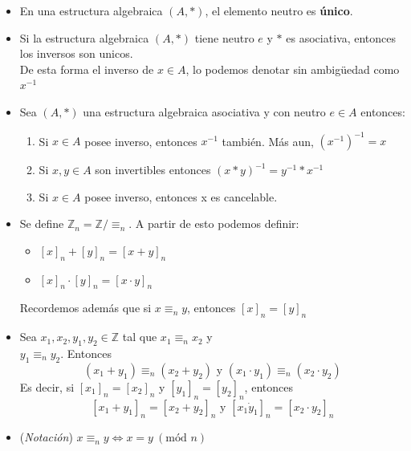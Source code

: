 \documentclass[letterpaper,10pt]{article}
\newcommand{\Z}{\mathbb Z}
\newcommand{\ssi}{\Longleftrightarrow} %
\theoremstyle{plain}
\begin{document}
\begin{framed}
\begin{multicols}{2}
\begin{itemize}
    \item En una estructura algebraica $(A,*)$, el elemento neutro es \textbf{único}.
    \item Si la estructura algebraica $(A,*)$ tiene neutro $e$ y $*$ es asociativa, entonces los inversos son unicos.\\
    De esta forma el inverso de $x\in A$, lo podemos denotar sin ambigüedad como $x^{-1}$
    
    \item Sea $(A,*)$ una estructura algebraica asociativa y con neutro $e \in A$ entonces:
        \begin{enumerate}
            \item Si $x\in A$ posee inverso, entonces $x^{-1}$ también. Más aun, $(x^{-1})^{-1}=x$
            \item Si $x,y \in A$ son invertibles entonces $(x*y)^{-1}=y^{-1}*x^{-1}$
            \item Si $x\in A$ posee inverso, entonces x es cancelable.
        \end{enumerate}
    \item Se define $\Z_n=\Z/\equiv_{n}$. A partir de esto podemos definir:
        \begin{itemize}
            \item $[x]_n + [y]_n=[x+y]_n$
            \item $[x]_n \cdot [y]_n=[x\cdot y]_n$
        \end{itemize}
    Recordemos además que si $x\equiv_n y$, entonces $[x]_n=[y]_n$
    
    \item Sea $x_1,x_2,y_1,y_2 \in \Z$ tal que $x_1\equiv_n x_2$ y \\$y_1\equiv_n y_2$. Entonces 
    $$ (x_1+y_1)\equiv_n (x_2+y_2) \text{ y }  (x_1\cdot y_1)\equiv_n (x_2\cdot y_2) $$
    Es decir, si $[x_1]_n = [x_2]_n$ y $[y_1]_n = [y_2]_n$, entonces
    $$ [x_1+y_1]_n=[x_2+y_2]_n \text{ y } [x_1\dot y_1]_n=[x_2 \cdot y_2]_n$$
    
    \item (\textit{Notación}) $x\equiv_ny  \ssi x=y ~(\text{mód } n)$
        \end{itemize}
    \end{multicols}
\end{framed}
\end{document}
